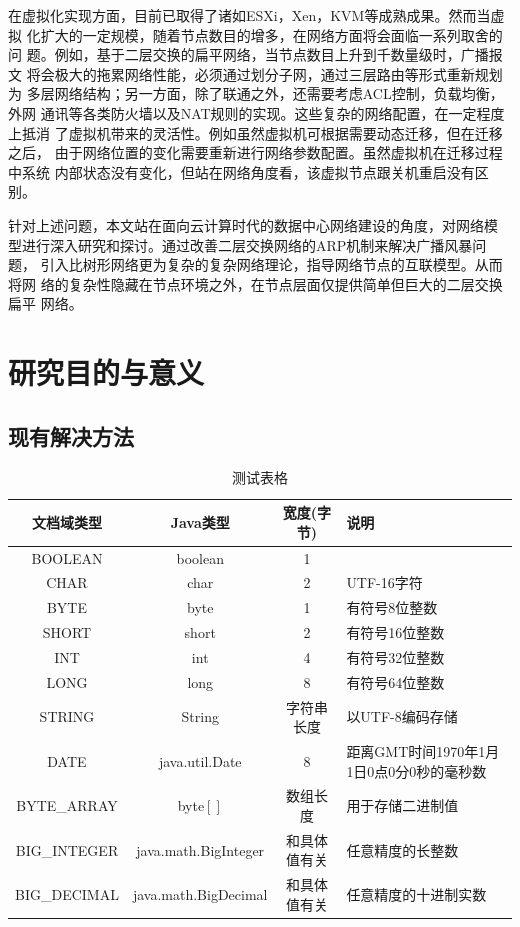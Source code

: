 \documentclass[phd,nobackinfo]{scutthesis}
\begin{document}
在虚拟化实现方面，目前已取得了诸如ESXi，Xen，KVM等成熟成果。然而当虚拟
化扩大的一定规模，随着节点数目的增多，在网络方面将会面临一系列取舍的问
题。例如，基于二层交换的扁平网络，当节点数目上升到千数量级时，广播报文
将会极大的拖累网络性能，必须通过划分子网，通过三层路由等形式重新规划为
多层网络结构；另一方面，除了联通之外，还需要考虑ACL控制，负载均衡，外网
通讯等各类防火墙以及NAT规则的实现。这些复杂的网络配置，在一定程度上抵消
了虚拟机带来的灵活性。例如虽然虚拟机可根据需要动态迁移，但在迁移之后，
由于网络位置的变化需要重新进行网络参数配置。虽然虚拟机在迁移过程中系统
内部状态没有变化，但站在网络角度看，该虚拟节点跟关机重启没有区别。

针对上述问题，本文站在面向云计算时代的数据中心网络建设的角度，对网络模
型进行深入研究和探讨。通过改善二层交换网络的ARP机制来解决广播风暴问题，
引入比树形网络更为复杂的复杂网络理论，指导网络节点的互联模型。从而将网
络的复杂性隐藏在节点环境之外，在节点层面仅提供简单但巨大的二层交换扁平
网络。

\section{研究目的与意义}
\subsection{现有解决方法}
\Blindtext
\begin{table}
  \centering
  \begin{tabular}{cccp{38mm}}
    \toprule
    \textbf{文档域类型} & \textbf{Java类型} & \textbf{宽度(字节)} & \textbf{说明} \\
    \midrule
    BOOLEAN  & boolean &  1  & \\
    CHAR     & char    &  2  & UTF-16字符 \\
    BYTE     & byte    &  1  & 有符号8位整数 \\
    SHORT    & short   &  2  & 有符号16位整数 \\
    INT      & int     &  4  & 有符号32位整数 \\
    LONG     & long    &  8  & 有符号64位整数 \\
    STRING   & String  &  字符串长度  & 以UTF-8编码存储 \\
    DATE     & java.util.Date & 8 & 距离GMT时间1970年1月1日0点0分0秒的毫秒数 \\
    BYTE\_ARRAY & byte$[]$ & 数组长度 & 用于存储二进制值 \\
    BIG\_INTEGER & java.math.BigInteger & 和具体值有关 & 任意精度的长整数 \\
    BIG\_DECIMAL & java.math.BigDecimal & 和具体值有关 & 任意精度的十进制实数 \\
    \bottomrule
  \end{tabular}
  \caption{测试表格}\label{table:test1}
\end{table}
\Blindtext
\end{document}
